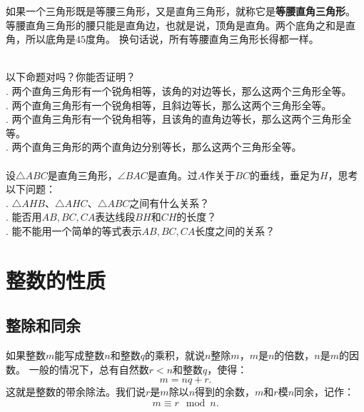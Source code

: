 \documentclass[12pt,UTF8]{ctexbook}
\begin{document}
如果一个三角形既是等腰三角形，又是直角三角形，就称它是\textbf{等腰直角三角形}。
等腰直角三角形的腰只能是直角边，也就是说，顶角是直角。两个底角之和是直角，所以底角是$45$度角。
换句话说，所有等腰直角三角形长得都一样。

\begin{sk}\label{sk:4-1-0}
    \mbox{}\\
    以下命题对吗？你能否证明？\\
    . 两个直角三角形有一个锐角相等，该角的对边等长，那么这两个三角形全等。\\
    . 两个直角三角形有一个锐角相等，且斜边等长，那么这两个三角形全等。\\
    . 两个直角三角形有一个锐角相等，且该角的直角边等长，那么这两个三角形全等。\\
    . 两个直角三角形的两个直角边分别等长，那么这两个三角形全等。\\
    \vspace{2pt}\\
    设$\triangle ABC$是直角三角形，$\angle BAC$是直角。过$A$作关于$BC$的垂线，垂足为$H$，思考以下问题：\\
    . $\triangle AHB$、$\triangle AHC$、$\triangle ABC$之间有什么关系？\\
    . 能否用$AB, BC, CA$表达线段$BH$和$CH$的长度？\\
    . 能不能用一个简单的等式表示$AB, BC, CA$长度之间的关系？
\end{sk}

\chapter{整数的性质}

\section{整除和同余}
如果整数$m$能写成整数$n$和整数$q$的乘积，就说$n$整除$m$，$m$是$n$的倍数，$n$是$m$的因数。
一般的情况下，总有自然数$r < n$和整数$q$，使得：
$$ m = nq + r.$$
这就是整数的带余除法。我们说$r$是$m$除以$n$得到的余数，$m$和$r$模$n$同余，记作：
$$ m \equiv r \mod n.$$
\end{document}
